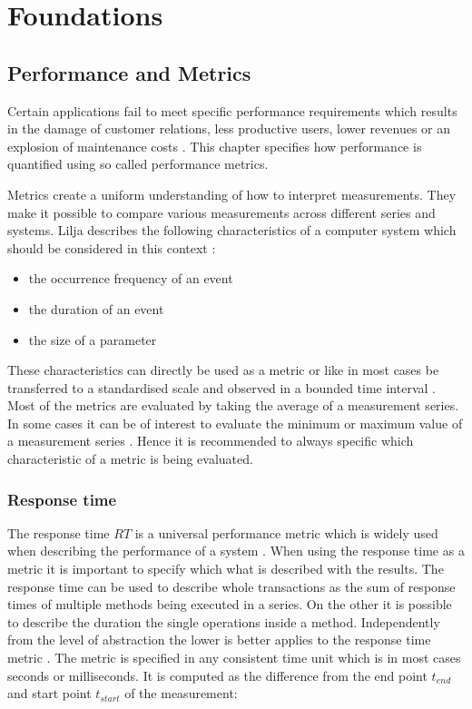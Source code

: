
\chapter{Foundations}
\label{cha:foundations}

\section{Performance and Metrics}
\label{sec:performance-metrics}
Certain applications fail to meet specific performance requirements which results in the damage of customer relations, less productive users, lower revenues or an explosion of maintenance costs \cite{smith.1998}. This chapter specifies how performance is quantified using so called performance metrics.

Metrics create a uniform understanding of how to interpret measurements. They make it possible to compare various measurements across different series and systems. Lilja describes the following characteristics of a computer system which should be considered in this context \cite[9]{lilja.2005}:

\begin{itemize}
  \item the occurrence frequency of an event
  \item the duration of an event
  \item the size of a parameter
\end{itemize}

These characteristics can directly be used as a metric or like in most cases be transferred to a standardised scale and observed in a bounded time interval \cite[9]{lilja.2005}. Most of the metrics are evaluated by taking the average of a measurement series. In some cases it can be of interest to evaluate the minimum or maximum value of a measurement series \cite[48]{jain.2008}. Hence it is recommended to always specific which characteristic of a metric is being evaluated.

\subsection*{Response time}
The response time $RT$ is a universal performance metric which is widely used when describing the performance of a system \cite{lilja.2005, cortellessa.2007}. When using the response time as a metric it is important to specify which what is described with the results. The response time can be used to describe whole transactions as the sum of response times of multiple methods being executed in a series. On the other it is possible to describe the duration the single operations inside a method. Independently from the level of abstraction the lower is better applies to the response time metric \cite[54]{jain.2008}. The metric is specified in any consistent time unit which is in most cases seconds or milliseconds. It is computed as the difference from the end point $t_{end}$ and start point $t_{start}$ of the measurement:

